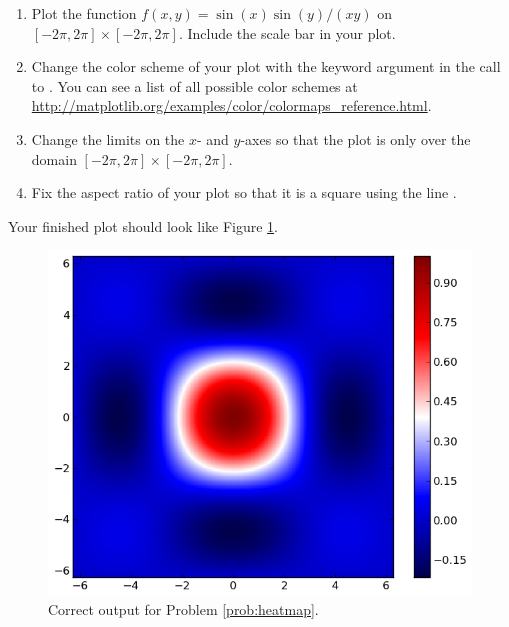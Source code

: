 \begin{problem}\label{prob:heatmap}
\leavevmode
\begin{enumerate}
\item Plot the function $f(x,y) = \sin(x)\sin(y)/(xy)$ on $[-2\pi,2\pi] \times [-2\pi,2\pi]$.
Include the scale bar in your plot.
\item Change the color scheme of your plot with the keyword argument  in the call to .
You can see a list of all possible color schemes at \url{http://matplotlib.org/examples/color/colormaps_reference.html}.
\item Change the limits on the $x$- and $y$-axes so that the plot is only over the domain $[-2\pi,2\pi] \times [-2\pi,2\pi]$.
\item Fix the aspect ratio of your plot so that it is a square using the line .
\end{enumerate}
Your finished plot should look like Figure \ref{fig:heatmapProb}.

\begin{figure}[H]
\includegraphics[width=.7\textwidth]{pcolor2.png}
\caption{Correct output for Problem \ref{prob:heatmap}.}
\label{fig:heatmapProb}
\end{figure}
\end{problem}

